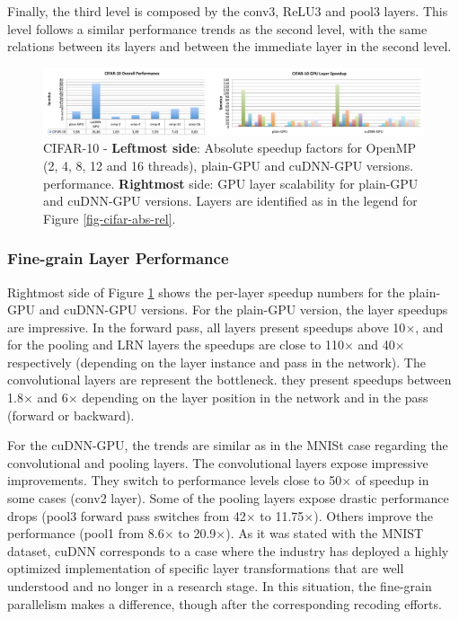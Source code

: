 Finally, the third level is composed by the conv3, ReLU3 and pool3 
layers. This level follows a similar performance trends as the second 
level, with the same relations between its layers and between the 
immediate layer in the second level.

\begin{figure}[]
\includegraphics[width=\textwidth]{figures/cifar-abs-perf+gpu-layer.pdf}
\caption{CIFAR-10 - \textbf{Leftmost side}: Absolute speedup factors for OpenMP (2, 4, 8, 12 and 16 threads), plain-GPU and cuDNN-GPU versions. performance. \textbf{Rightmost} side: GPU layer scalability for plain-GPU and cuDNN-GPU versions. Layers are identified as in the legend for Figure \ref{fig-cifar-abs-rel}.}
\label{fig-cifar-overall}
\end{figure}

\subsubsection{Fine-grain Layer Performance}
Rightmost side of Figure \ref{fig-cifar-overall} shows the per-layer
speedup numbers for the plain-GPU and cuDNN-GPU versions.
For the plain-GPU version, the layer speedups are impressive. 
In the forward pass, all layers present speedups above 10$\times$, and for 
the pooling and LRN layers the speedups are close to 110$\times$ and 40$\times$
respectively (depending on the layer instance and pass in the network). 
The convolutional layers are represent the bottleneck. they present 
speedups between 1.8$\times$ and 6$\times$ depending on the layer position in the 
network and in the pass (forward or backward).

For the cuDNN-GPU, the trends are similar as in the MNISt case 
regarding the convolutional and pooling layers. The convolutional 
layers expose impressive improvements. They switch to performance 
levels close to 50$\times$ of speedup in some cases (conv2 layer).
Some of the pooling layers expose drastic performance drops (pool3 
forward pass switches from 42$\times$ to 11.75$\times$). Others improve the 
performance (pool1 from 8.6$\times$ to 20.9$\times$). 
As it was stated with the MNIST dataset, cuDNN corresponds to a case 
where the industry has deployed a highly optimized implementation of 
specific layer transformations that are well understood and no longer 
in a research stage. In this situation, the fine-grain parallelism makes 
a difference, though after the corresponding recoding efforts.

